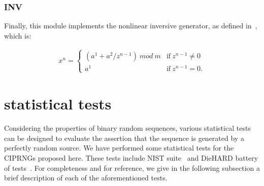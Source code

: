 \documentclass[10pt, conference, compsocconf]{IEEEtran}
\begin{document}

\subsubsection{INV}
Finally, this module implements the nonlinear inversive generator, as defined in~\cite{testU01}, which is:

\begin{equation}
\label{INV}
\begin{array}{l}
x^n=\left\{
\begin{array}{ll}
(a^1 + a^2 / z^{n-1})~mod~m & \text{if}~ z^{n-1} \neq 0 \\
a^1 & \text{if}~  z^{n-1} = 0 .\end{array} \right. \end{array}\end{equation}





\section{statistical tests}
\label{Security analysis}

Considering the properties of binary random sequences, various statistical tests can be designed to evaluate the assertion that the sequence is generated by a perfectly random source. We have performed some statistical tests for the CIPRNGs proposed here. These tests include NIST suite~\cite{ANDREW2008} and DieHARD battery of tests~\cite{DieHARD}. For completeness and for reference, we give in the following subsection a brief description of each of the aforementioned tests.
\end{document}
